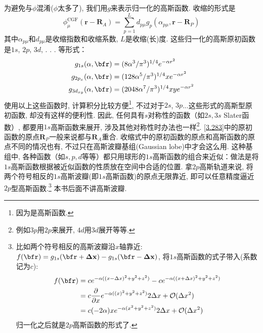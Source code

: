 为避免与$\phi$混淆($\phi$太多了), 
我们用$g$来表示归一化的高斯函数. 
收缩的形式是
\begin{equation}
	\phi^\mathrm{CGF}_\mu(\mathbf{r-R}_A)=\sum_{p=1}^{L}d_{p\mu}g_p(\alpha_{p\mu},\mathbf{r-R}_P)
	\label{3.283}
\end{equation}
其中$\alpha_{p\mu}$和$d_{p\mu}$是收缩指数和收缩系数, 
$L$是收缩(长)度. 
这些归一化的高斯原初函数是$1s$, 
$2p$, 
$3d$, 
.
.
.
等形式：
\begin{align}
	g_{1s}(\alpha,\bfr)      & = (8\alpha^3/\pi^3)^{1/4}       e^{-\alpha r^2}\\
	g_{2p_x}(\alpha,\bfr)    & = (128\alpha^5/\pi^3)^{1/4}  x  e^{-\alpha r^2}\\
	g_{3d_{xy}}(\alpha,\bfr) & = (2048\alpha^7/\pi^3)^{1/4} xy e^{-\alpha r^2}
\end{align}
使用以上这些函数时, 计算积分比较方便\footnote{因为是高斯函数. },
不过对于$2s$, $3p$...这些形式的高斯型原初函数, 却没有这样的便利性. 
因此, 任何具有$s$对称性的函数（如$2s,3s$ Slater函数）,
都要用$1s$高斯函数来展开,
涉及其他对称性时办法也一样\footnote{例如$3p$用$2p$来展开, $4d$用$3d$展开等等. }. 
\autoref{3.283}中的原初函数的原点$\mathbf{R}_P$一般来说都与$\mathbf{R}_A$重合. 
收缩式中的原初函数的原点和高斯函数的原点不同的情况也有,
不过只在高斯波瓣基组(Gaussian lobe)中才会这么用. 
这种基组中, 各种函数（如$s,p,d$等等）都只用球形的$1s$高斯函数的组合来近似：做法是将$1s$高斯函数根据被近似函数的性质放在空间中合适的位置. 
拿$2p$高斯轨道来说, 将两个符号相反的$1s$高斯波瓣(即$1s$高斯函数)的原点无限靠近,
即可以任意精度逼近$2p$型高斯函数.\footnote{
	比如两个符号相反的高斯波瓣沿$x$轴靠近: $f(\bfr)=g_{1s}(\bfr+\mathbf{\Delta x})-g_{1s}(\bfr-\mathbf{\Delta x})$, 
	将$1s$高斯函数的式子带入(系数记为$c$):
	\begin{align*}
		f(\bfr) & = ce^{-\alpha((x-\Delta x)^2+y^2+z^2)}-
		ce^{-\alpha((x+\Delta x)^2+y^2+z^2)}\\
		& = c\frac{\partial}{\partial x}e^{-\alpha((x)^2+y^2+z^2)}2\Delta x +\mathcal{O}(\Delta x^2)\\
		& = c(-2\alpha) xe^{-\alpha(x^2+y^2+z^2)}2\Delta x +\mathcal{O}(\Delta x^2)
	\end{align*}
	归一化之后就是$2p$高斯函数的形式了.
}
本书后面不讲高斯波瓣. 


